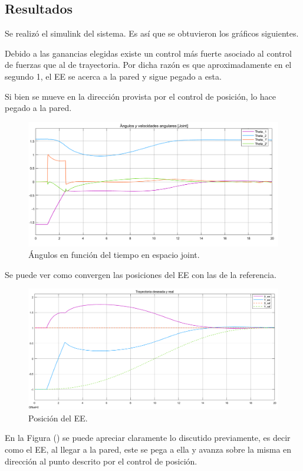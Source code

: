 \subsection{Resultados}
Se realizó el simulink del sistema. Es así que se obtuvieron los gráficos siguientes.

Debido a las ganancias elegidas existe un control más fuerte asociado al control de fuerzas que al de trayectoria. Por dicha razón es que aproximadamente en el segundo 1, el EE se acerca a la pared y sigue pegado a esta.

Si bien se mueve en la dirección provista por el control de posición, lo hace pegado a la pared.
\begin{figure}[H]
	\centering
	\includegraphics[width=0.8\linewidth]{ImagenesControl híbrido no lineal/3_3_a}
	\caption{Ángulos en función del tiempo en espacio joint.}	
	\label{fig:cthetas}
\end{figure}

Se puede ver como convergen las posiciones del EE con las de la referencia.
\begin{figure}[H]
	\centering
	\includegraphics[width=0.8\linewidth]{ImagenesControl híbrido no lineal/3_3_b}
	\caption{Posición  del EE.}	
	\label{fig:cpos}
\end{figure}

En la Figura () se puede apreciar claramente lo discutido previamente, es decir como el EE, al llegar a la pared, este se pega a ella y avanza sobre la misma en dirección al punto descrito por el control de posición.


